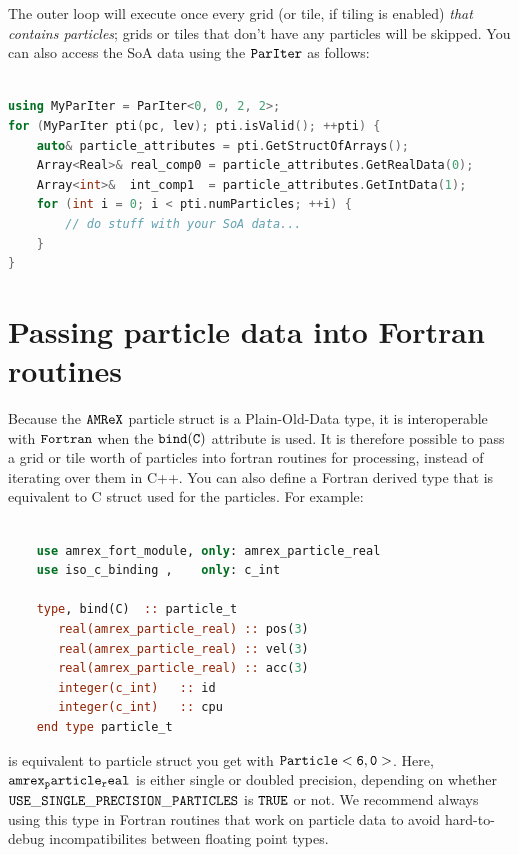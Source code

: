 The outer loop will execute once every grid (or tile, if tiling is enabled) \emph{that contains particles}; grids or tiles
that don't have any particles will be skipped. You can also access the SoA data using the $\tt{ParIter}$ as follows:

\begin{lstlisting}[language=cpp]

using MyParIter = ParIter<0, 0, 2, 2>;
for (MyParIter pti(pc, lev); pti.isValid(); ++pti) {
    auto& particle_attributes = pti.GetStructOfArrays();
    Array<Real>& real_comp0 = particle_attributes.GetRealData(0);
    Array<int>&  int_comp1  = particle_attributes.GetIntData(1);
    for (int i = 0; i < pti.numParticles; ++i) {
        // do stuff with your SoA data...
    }
}
\end{lstlisting}

\section{Passing particle data into Fortran routines}
\label{sec:Particles:Fortran}

Because the $\tt{AMReX}$ particle struct is a Plain-Old-Data type, it is interoperable with $\tt{Fortran}$ when the $\tt{bind(C)}$
attribute is used. It is therefore possible to pass a grid or tile worth of particles into fortran routines for processing,
instead of iterating over them in C++. You can also define a Fortran derived type that is equivalent to C struct used for the
particles. For example:

\begin{lstlisting}[language=fortran]

    use amrex_fort_module, only: amrex_particle_real
    use iso_c_binding ,    only: c_int

    type, bind(C)  :: particle_t
       real(amrex_particle_real) :: pos(3)
       real(amrex_particle_real) :: vel(3)
       real(amrex_particle_real) :: acc(3)
       integer(c_int)   :: id
       integer(c_int)   :: cpu
    end type particle_t

\end{lstlisting}

is equivalent to particle struct you get with $\tt{Particle<6, 0>}$. Here, $\tt{amrex_particle_real}$ is either single or doubled precision, depending 
on whether $\tt{USE\_SINGLE\_PRECISION\_PARTICLES}$ is $\tt{TRUE}$ or not. We recommend always using this type in Fortran routines that work on particle
data to avoid hard-to-debug incompatibilites between floating point types.

